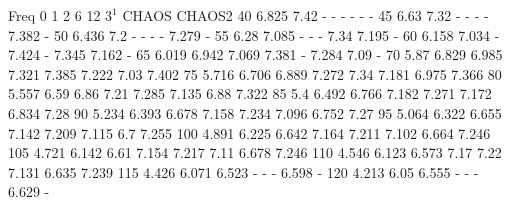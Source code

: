 Freq 0 1 2 6 12 $3^1$ CHAOS CHAOS2
40 6.825 7.42 - - - - - -
45 6.63 7.32 - - - - 7.382 -
50 6.436 7.2 - - - - 7.279 -
55 6.28 7.085 - - - 7.34 7.195 -
60 6.158 7.034 - 7.424 - 7.345 7.162 -
65 6.019 6.942 7.069 7.381 - 7.284 7.09 -
70 5.87 6.829 6.985 7.321 7.385 7.222 7.03 7.402
75 5.716 6.706 6.889 7.272 7.34 7.181 6.975 7.366
80 5.557 6.59 6.86 7.21 7.285 7.135 6.88 7.322
85 5.4 6.492 6.766 7.182 7.271 7.172 6.834 7.28
90 5.234 6.393 6.678 7.158 7.234 7.096 6.752 7.27
95 5.064 6.322 6.655 7.142 7.209 7.115 6.7 7.255
100 4.891 6.225 6.642 7.164 7.211 7.102 6.664 7.246
105 4.721 6.142 6.61 7.154 7.217 7.11 6.678 7.246
110 4.546 6.123 6.573 7.17 7.22 7.131 6.635 7.239
115 4.426 6.071 6.523 - - - 6.598 -
120 4.213 6.05 6.555 - - - 6.629 -
